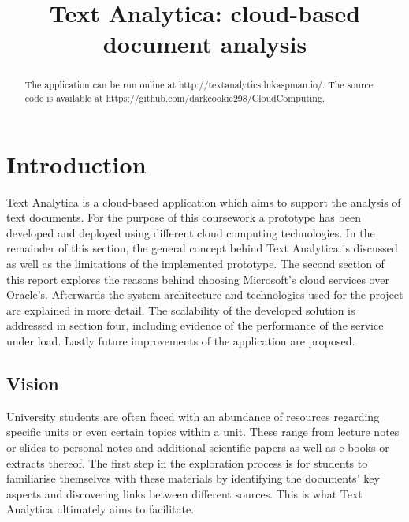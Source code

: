 \documentclass[conference]{IEEEtran}
\begin{document}
\title{Text Analytica: cloud-based document analysis\\}

\author{
\and
{}
}

\maketitle

\begin{abstract}
The application can be run online at http://textanalytics.lukaspman.io/.
The source code is available at https://github.com/darkcookie298/CloudComputing.
\end{abstract}

\section{Introduction}
Text Analytica is a cloud-based application which aims to support the analysis of text documents. For the purpose of this coursework a prototype has been developed and deployed using different cloud computing technologies. In the remainder of this section, the general concept behind Text Analytica is discussed as well as the limitations of the implemented prototype. The second section of this report explores the reasons behind choosing Microsoft’s cloud services over Oracle’s. Afterwards the system architecture and technologies used for the project are explained in more detail. The scalability of the developed solution is addressed in section four, including evidence of the performance of the service under load. Lastly future improvements of the application are proposed.

\subsection{Vision}
University students are often faced with an abundance of resources regarding specific units or even certain topics within a unit. These range from lecture notes or slides to personal notes and additional scientific papers as well as e-books or extracts thereof. The first step in the exploration process is for students to familiarise themselves with these materials by identifying the documents’ key aspects and discovering links between different sources. This is what Text Analytica ultimately aims to facilitate.
\end{document}
